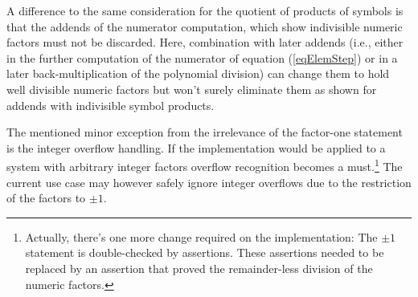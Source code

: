 A difference to the same consideration for the quotient of products of
symbols is that the addends of the numerator computation, which show
indivisible numeric factors must not be discarded. Here, combination with
later addends (i.e., either in the further computation of the numerator of
equation (\ref{eqElemStep}) or in a later back-multiplication of the
polynomial division) can change them to hold well divisible numeric
factors but won't surely eliminate them as shown for addends with
indivisible symbol products.

The mentioned minor exception from the irrelevance of the factor-one
statement is the integer overflow handling. If the implementation would be
applied to a system with arbitrary integer factors overflow recognition
becomes a must.\footnote{Actually, there's one more change required on the
implementation: The $\pm 1$ statement is double-checked by assertions.
These assertions needed to be replaced by an assertion that proved the
remainder-less division of the numeric factors.} The current use case may
however safely ignore integer overflows due to the restriction of the
factors to $\pm 1$.